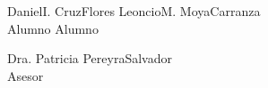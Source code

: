 \documentclass[a4paper, 12pt]{article}
\begin{document}
    



\vskip 0.3cm



\vskip 1cm
\vskip 1cm
\vskip 1cm
\vskip 1cm
\vskip 1cm

\hspace{0.7cm}Daniel\hspace{.1cm}I.\hspace{.1cm} Cruz\hspace{.1cm}Flores 
\hspace{4cm}Leoncio\hspace{.1cm}M.\hspace{.1cm} Moya\hspace{.1cm}Carranza \\
\hspace*{2.6cm} Alumno  \hspace*{6.6cm}Alumno


\vskip 1cm
\begin{center}
Dra. \hspace{.1cm}Patricia\hspace{.1cm} Pereyra\hspace{.1cm}Salvador\\
 Asesor
\end{center}
\end{document}
